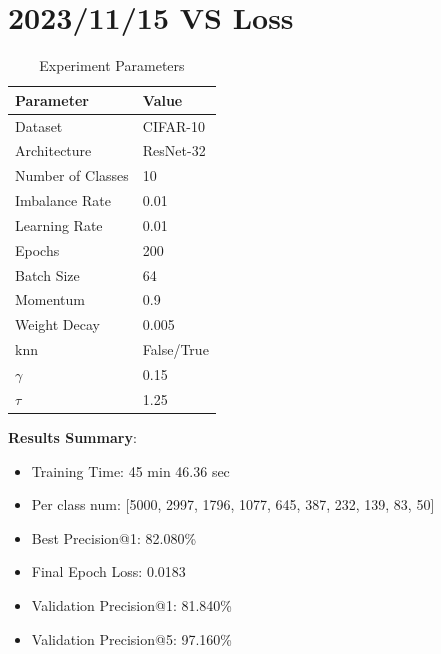 \documentclass{article}
\begin{document}
\section{2023/11/15 VS Loss}
\begin{table}[h!]
\centering
\caption{Experiment Parameters}
\label{tab:parameters_vs}
\begin{tabular}{ll}
\toprule
Parameter & Value \\
\midrule
Dataset & CIFAR-10 \\
Architecture & ResNet-32 \\
Number of Classes & 10 \\
Imbalance Rate & 0.01 \\
Learning Rate & 0.01 \\
Epochs & 200 \\
Batch Size & 64 \\
Momentum & 0.9 \\
Weight Decay & 0.005 \\
knn & False/True \\
\(\gamma\) & 0.15 \\
\(\tau\) & 1.25 \\
\bottomrule
\end{tabular}
\end{table}

\textbf{Results Summary}:
\begin{itemize}
    \item Training Time: 45 min 46.36 sec
    \item Per class num: [5000, 2997, 1796, 1077, 645, 387, 232, 139, 83, 50]
    \item Best Precision@1: 82.080\%
    \item Final Epoch Loss: 0.0183
    \item Validation Precision@1: 81.840\%
    \item Validation Precision@5: 97.160\%
\end{itemize}
\end{document}
